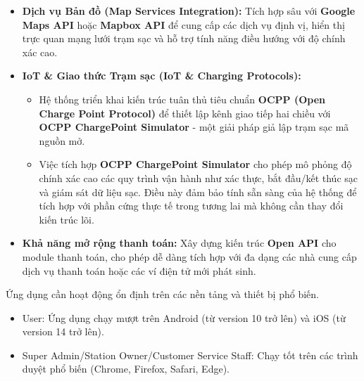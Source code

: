 \begin{itemize}
    \item \textbf{Dịch vụ Bản đồ (Map Services Integration):} 
    Tích hợp sâu với \textbf{Google Maps API} hoặc \textbf{Mapbox API} để cung cấp các dịch vụ định vị, hiển thị trực quan mạng lưới trạm sạc và hỗ trợ tính năng điều hướng với độ chính xác cao.

    \item \textbf{IoT \& Giao thức Trạm sạc (IoT \& Charging Protocols):}
    \begin{itemize}
        \item Hệ thống triển khai kiến trúc tuân thủ tiêu chuẩn \textbf{OCPP (Open Charge Point Protocol)} để thiết lập kênh giao tiếp hai chiều với \textbf{OCPP ChargePoint Simulator} - một giải pháp giả lập trạm sạc mã nguồn mở.
        \item Việc tích hợp \textbf{OCPP ChargePoint Simulator} cho phép mô phỏng độ chính xác cao các quy trình vận hành như xác thực, bắt đầu/kết thúc sạc và giám sát dữ liệu sạc. Điều này đảm bảo tính sẵn sàng của hệ thống để tích hợp với phần cứng thực tế trong tương lai mà không cần thay đổi kiến trúc lõi.
    \end{itemize}

    \item \textbf{Khả năng mở rộng thanh toán:} 
    Xây dựng kiến trúc \textbf{Open API} cho module thanh toán, cho phép dễ dàng tích hợp với đa dạng các nhà cung cấp dịch vụ thanh toán hoặc các ví điện tử mới phát sinh.
\end{itemize}


Ứng dụng cần hoạt động ổn định trên các nền tảng và thiết bị phổ biến.
    \begin{itemize}
        \item User: Ứng dụng chạy mượt trên Android (từ version 10 trở lên) và iOS (từ version 14 trở lên).
        \item Super Admin/Station Owner/Customer Service Staff: Chạy tốt trên các trình duyệt phổ biến (Chrome, Firefox, Safari, Edge).
    \end{itemize}